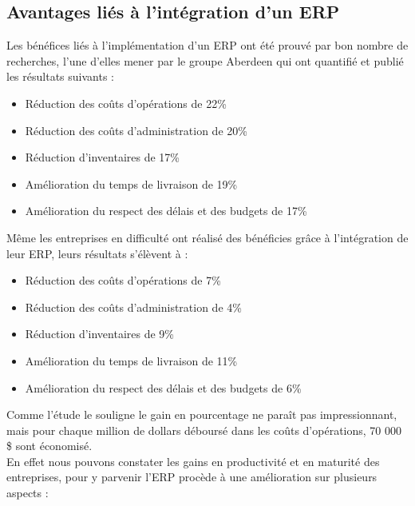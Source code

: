     \subsection{Avantages liés à l’intégration d’un ERP}
        Les bénéfices liés à l’implémentation d’un ERP ont été prouvé par bon nombre de recherches, l’une d’elles mener par le groupe Aberdeen qui ont quantifié et publié les résultats suivants :\\

        \begin{itemize}
            \item Réduction des coûts d’opérations de 22\%
            \item Réduction des coûts d’administration de 20\%
            \item Réduction d’inventaires de 17\%
            \item Amélioration du temps de livraison de 19\%
            \item Amélioration du respect des délais et des budgets de 17\%\\
        \end{itemize}

        Même les entreprises en difficulté ont réalisé des bénéficies grâce à l’intégration de leur ERP, leurs résultats s’élèvent à :\\

        \begin{itemize}
            \item Réduction des coûts d’opérations de 7\%
            \item Réduction des coûts d’administration de 4\%
            \item Réduction d’inventaires de 9\%
            \item Amélioration du temps de livraison de 11\%
            \item Amélioration du respect des délais et des budgets de 6\%\\
        \end{itemize}

        Comme l’étude le souligne le gain en pourcentage ne paraît pas impressionnant, mais pour chaque million de dollars déboursé dans les coûts d’opérations, 70 000 \$ sont économisé.\\

        En effet nous pouvons constater les gains en productivité et en maturité des entreprises, pour y parvenir l’ERP procède à une amélioration sur plusieurs aspects :

